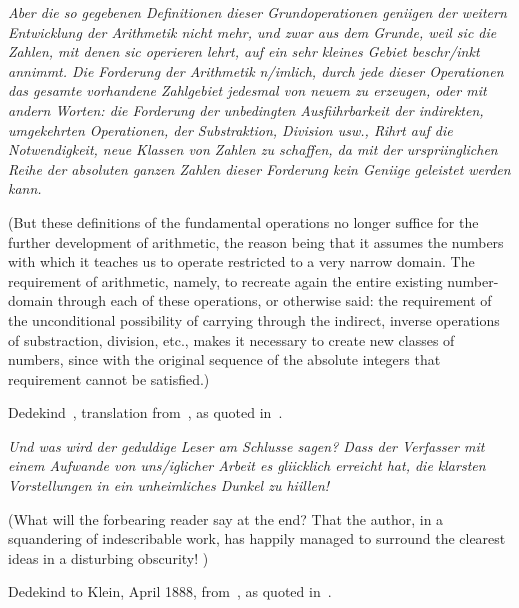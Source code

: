 \setcounter{currentlevel}{\value{baseSectionLevel}}
\label{sec:Numbers}

\epigraph{
\textsl{Aber die so gegebenen Definitionen dieser Grundoperationen
geniigen der weitern Entwicklung der Arithmetik nicht mehr, 
und zwar aus dem Grunde, weil sic
die Zahlen, mit denen sic operieren lehrt, auf ein sehr kleines 
Gebiet beschr/inkt annimmt. Die
Forderung der Arithmetik n/imlich, durch jede dieser Operationen 
das gesamte vorhandene Zahlgebiet
jedesmal von neuem zu erzeugen, oder mit andern Worten: 
die Forderung der unbedingten
Ausfiihrbarkeit der indirekten, umgekehrten Operationen, 
der Substraktion, Division usw., Rihrt
auf die Notwendigkeit, neue Klassen von Zahlen zu schaffen, 
da mit der urspriinglichen Reihe
der absoluten ganzen Zahlen 
dieser Forderung kein Geniige geleistet werden kann.}
\par
(But these definitions of the fundamental operations 
no longer suffice for the further development
of arithmetic, the reason being that it assumes the numbers with 
which it teaches us
to operate restricted to a very narrow domain. The requirement of 
arithmetic, namely, to
recreate again the entire existing number-domain through each 
of these operations, or otherwise
said: the requirement of the unconditional possibility 
of carrying through the indirect,
inverse operations of substraction, division, etc., 
makes it necessary to create new classes of
numbers, since with the original sequence 
of the absolute integers that requirement cannot be
satisfied.)}%
{Dedekind~\cite{Dedekind1854}, 
translation from~\cite{Ewald2005KantToHilbert},
as quoted in~\cite{ferreiros2007labyrinth}.}

\epigraph{
\textsl{Und was wird der geduldige Leser am
Schlusse sagen? Dass der Verfasser mit einem Aufwande von uns/iglicher Arbeit es gliicklich
erreicht hat, die klarsten Vorstellungen in ein unheimliches Dunkel zu hiillen!}
\par
(What will the forbearing reader say at the end? That the author, in a squandering of indescribable
work, has happily managed to surround the clearest ideas in a disturbing obscurity!
)}%
{Dedekind to Klein, April 1888, 
from~\cite{dugac1976DedekindFondements},
as quoted in~\cite{ferreiros2007labyrinth}.}


% 


